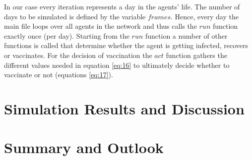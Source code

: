 \documentclass[11pt]{article}
\begin{document}
In our case every iteration represents a day in the agents' life. The number of days to be simulated is defined by the variable $frames$.
Hence, every day the main file loops over all agents in the network and thus calls the $run$ function exactly once (per day). Starting from the $run$ function a number of other functions is called that determine whether the agent is getting infected, recovers or vaccinates. For the decision of vaccination the $act$ function gathers the different values needed in equation \eqref{eq:16} to ultimately decide whether to vaccinate or not (equations \eqref{eq:17}).


\section{Simulation Results and Discussion}



\section{Summary and Outlook}








\clearpage
\end{document}
